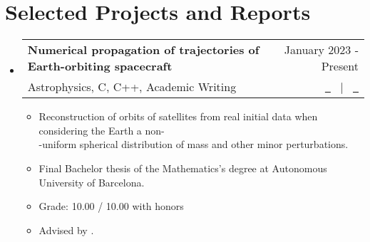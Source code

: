 \documentclass[a4paper,11pt]{article}
\makeatletter
\newcommand{\resumeQuadHeading}[4]{
  \item
  \begin{tabular*}{0.96\textwidth}[t]{l@{\extracolsep{\fill}}r}
    \textbf{#1} & \small #2 \\
    \small#3 & \small #4 \\
  \end{tabular*}
}
\newcommand{\resumeHeadingListStart}{
  \begin{itemize}[leftmargin=0.15in, label={}]
}
\newcommand{\resumeHeadingListEnd}{\end{itemize}}
\makeatother
\begin{document}
\section{Selected Projects and Reports}

\resumeHeadingListStart{}
\resumeQuadHeading{Numerical propagation of trajectories of Earth-orbiting spacecraft}{January 2023 - Present}{Astrophysics, C, C++, Academic Writing}{\href{https://github.com/victorballester7/final-bachelor-thesis/releases/latest/download/main.pdf}{\faFileTextO \ \graydotuline{Report}} \ $|$ \ \href{https://github.com/victorballester7/final-bachelor-thesis}{\faGithub \ \graydotuline{Code}}}
\begin{itemize}[leftmargin=3em, itemsep=0.1em, topsep=2pt]
  \item \small Reconstruction of orbits of satellites from real initial data when considering the Earth a non-\\-uniform spherical distribution of mass and other minor perturbations.
  \item \small Final Bachelor thesis of the Mathematics's degree at Autonomous University of Barcelona.
  \item Grade: 10.00 / 10.00 with honors
  \item \small Advised by \href{http://www.gsd.uab.es/people?controller=member&view=member&id=9&slug=josep-maria}{}.
\end{itemize}
\resumeHeadingListEnd{}
\end{document}
